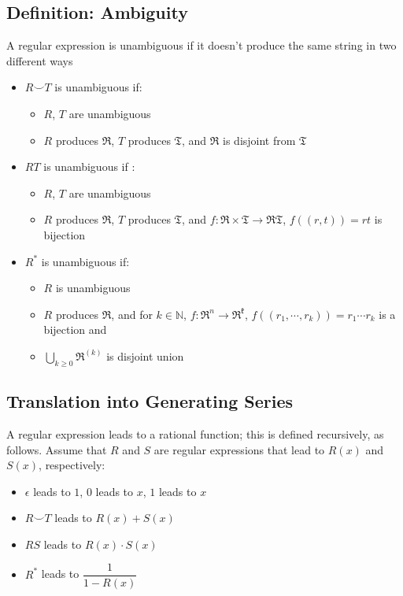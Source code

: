 \documentclass[11pt]{article}
\newcommand{\N}{{\mathbb{N}}}
\newcommand{\ds}{\displaystyle}
\begin{document}
\subsection{Definition: Ambiguity}
A regular expression is unambiguous if it doesn't produce the same string in two different ways 
\begin{itemize}
  \item $R\smallsmile T$ is unambiguous if:
  \begin{itemize}
    \item $R$, $T$ are unambiguous
    \item $R$ produces $\mathfrak{R}$, $T$ produces $\mathfrak{T}$, and $\mathfrak{R}$ is disjoint from $\mathfrak{T}$
  \end{itemize}
  \item $RT$ is unambiguous if :
  \begin{itemize}
    \item $R$, $T$ are unambiguous
    \item $R$ produces $\mathfrak{R}$, $T$ produces $\mathfrak{T}$, and $f:\mathfrak{R}\times\mathfrak{T}\rightarrow\mathfrak{R}\mathfrak{T}$, $f((r,t))=rt$ is bijection 
  \end{itemize}
  \item $R^*$ is unambiguous if:
  \begin{itemize}
    \item $R$ is unambiguous
    \item $R$ produces $\mathfrak{R}$, and for $k\in\N$, $f:\mathfrak{R}^n\rightarrow\mathfrak{R^{k}}$, $f((r_1,\cdots,r_k))=r_1\cdots r_k$ is a bijection and 
    \item $\ds\bigcup_{k\geq0}\mathfrak{R}^{(k)}$ is disjoint union 
  \end{itemize}
\end{itemize}
\subsection{Translation into Generating Series}
A regular expression leads to a rational function; this is defined recursively, as follows. Assume that $R$ and $S$ are regular expressions that lead to $R(x)$ and $S(x)$, respectively:
\begin{itemize}
  \item $\epsilon$ leads to $1$, $0$ leads to $x$, $1$ leads to $x$
  \item $R\smile T$ leads to $R(x)+S(x)$
  \item $RS$ leads to $R(x)\cdot S(x)$
  \item $R^*$ leads to $\dfrac{1}{1-R(x)}$
\end{itemize}
\end{document}
